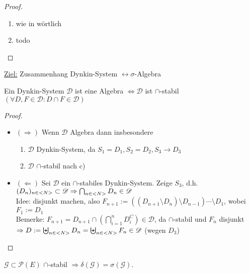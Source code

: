 \begin{proof}
	\begin{enumerate}[label=(\alph*)]
		\item wie in  wörtlich %
		\item todo
	\end{enumerate}
\end{proof}

\underline{Ziel:} Zusammenhang Dynkin-System $\leftrightarrow \sigma$-Algebra 

\begin{lemma}
	Ein Dynkin-System $\mathscr{D}$ ist eine Algebra $\Leftrightarrow \mathscr{D}$ ist $\cap$-stabil $(\forall D,F \in \mathscr{D}\colon D \cap F \in \mathscr{D})$  
\end{lemma}

\begin{proof}
	\begin{itemize}
		\item $(\Rightarrow)$ Wenn $\mathscr{D}$ Algebra dann insbesondere
			\begin{enumerate}[label=(\alph*)]
				\item $\mathscr{D}$ Dynkin-System, da $S_1=D_1, S_2=D_2, S_3 \to D_3$
				\item $\mathscr{D}$ $\cap$-stabil nach c)
			\end{enumerate}
		\item $(\Leftarrow)$ Sei $\mathscr{D}$ ein $\cap$-stabiles Dynkin-System. Zeige $S_3$, d.h. $(D_n)_{n\in <N>} \subset \mathscr{D} \Rightarrow \bigcap_{n\in <N>} D_n \in \mathscr{D}$\\
		Idee: disjunkt machen, also $F_{n+1} := ((D_{n+1}\setminus D_n)\setminus D_{n-1})\cdots \setminus D_1$, wobei $F_1 := D_1$\\
		Bemerke: $F_{n+1} = D_{n+1} \cap \left(\bigcap_{i=1}^n D_i^C\right) \in \mathscr{D}$, da $\cap$-stabil und $F_n$ disjunkt\\
		$\Rightarrow D:= \biguplus_{n\in <N>} D_n = \biguplus_{n \in <N>} F_n \in \mathscr{D}$ (wegen $D_3$)
		\end{itemize}
\end{proof}

\begin{proposition}
	$\mathscr{G} \subset \mathscr{P}(E)$ $\cap$-stabil $\Rightarrow \delta(\mathscr{G}) = \sigma(\mathscr{G})$.
\end{proposition}

